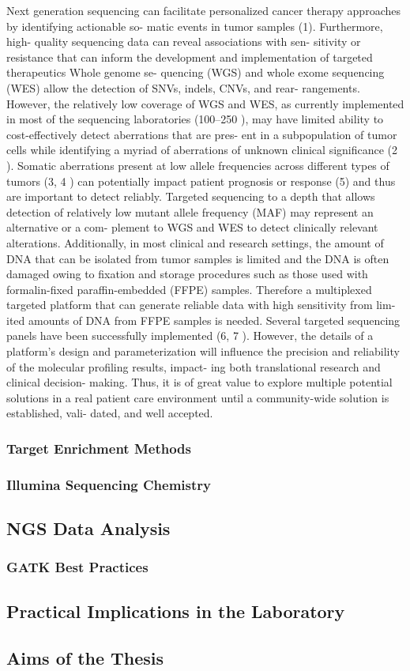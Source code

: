     Next generation sequencing can facilitate personalized cancer therapy
    approaches by identifying actionable so- matic events in tumor samples (1).
    Furthermore, high- quality sequencing data can reveal associations with sen-
    sitivity or resistance that can inform the development and implementation of
    targeted therapeutics Whole genome se- quencing (WGS) and whole exome
    sequencing (WES) allow the detection of SNVs, indels, CNVs, and rear-
    rangements. However, the relatively low coverage of WGS and WES, as
    currently implemented in most of the sequencing laboratories (100–250 ), may
    have limited ability to cost-effectively detect aberrations that are pres-
    ent in a subpopulation of tumor cells while identifying a myriad of
    aberrations of unknown clinical significance (2 ). Somatic aberrations
    present at low allele frequencies across different types of tumors (3, 4 )
    can potentially impact patient prognosis or response (5) and thus are
    important to detect reliably. Targeted sequencing to a depth that allows
    detection of relatively low mutant allele frequency (MAF) may represent an
    alternative or a com- plement to WGS and WES to detect clinically relevant
    alterations. Additionally, in most clinical and research settings, the
    amount of DNA that can be isolated from tumor samples is limited and the DNA
    is often damaged owing to fixation and storage procedures such as those used
    with formalin-fixed paraffin-embedded (FFPE) samples. Therefore a
    multiplexed targeted platform that can generate reliable data with high
    sensitivity from lim- ited amounts of DNA from FFPE samples is needed.
    Several targeted sequencing panels have been successfully implemented (6, 7 ).
    However, the details of a platform’s design and parameterization will
    influence the precision and reliability of the molecular profiling results,
    impact- ing both translational research and clinical decision- making. Thus,
    it is of great value to explore multiple potential solutions in a real
    patient care environment until a community-wide solution is established,
    vali- dated, and well accepted.

    \subsubsection{Target Enrichment Methods}

    \subsubsection{Illumina Sequencing Chemistry}

  \subsection{NGS Data Analysis}

    \subsubsection{GATK Best Practices}

  \subsection{Practical Implications in the Laboratory}

  \subsection{Aims of the Thesis}
